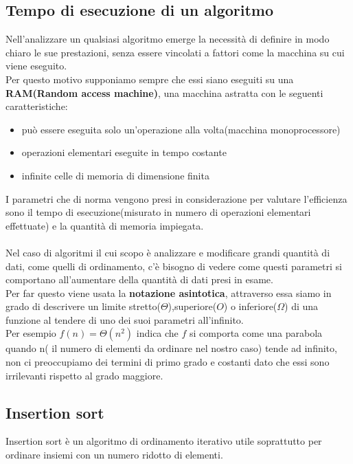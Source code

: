\documentclass[]{article}
\begin{document}
\subsection{Tempo di esecuzione di un algoritmo}
Nell'analizzare un qualsiasi algoritmo emerge la necessità di definire in modo chiaro le sue prestazioni, senza essere vincolati a fattori come la macchina su cui viene eseguito.\\ Per questo motivo supponiamo sempre che essi siano eseguiti su una \textbf{RAM(Random access machine)}, una macchina astratta con le seguenti caratteristiche:
\begin{itemize}
\item può essere eseguita solo un'operazione alla volta(macchina monoprocessore)
\item operazioni elementari eseguite in tempo costante
\item infinite celle di memoria di dimensione finita
\end{itemize}
I parametri che di norma vengono presi in considerazione per valutare l'efficienza sono il tempo di esecuzione(misurato in numero di operazioni elementari effettuate) e la quantità di memoria impiegata.\\
\\
Nel caso di algoritmi il cui scopo è analizzare e modificare grandi quantità di dati, come quelli di ordinamento, c'è bisogno di vedere come questi parametri si comportano all'aumentare della quantità di dati presi in esame.\\
Per far questo viene usata la \textbf{notazione asintotica}, attraverso essa siamo in grado di descrivere un limite stretto($\Theta$),superiore($O$) o inferiore($\Omega$) di una funzione al tendere di uno dei suoi parametri all'infinito.\\
Per esempio $f(n) = \Theta(n^2)$ indica che $f$ si comporta come una parabola quando n( il numero di elementi da ordinare nel nostro caso) tende ad infinito, non ci preoccupiamo dei termini di primo grado e costanti dato che essi sono irrilevanti rispetto al grado maggiore.

\newpage
\subsection{Insertion sort}
Insertion sort è un algoritmo di ordinamento iterativo utile soprattutto per ordinare insiemi con un numero ridotto di elementi.
\end{document}
